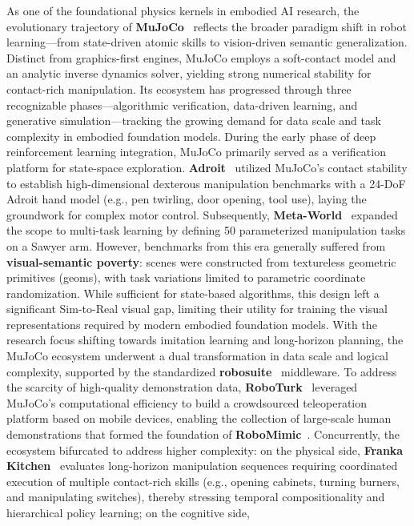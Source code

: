 \documentclass[acmsmall,screen,review,anonymous]{acmart}
\begin{document}
As one of the foundational physics kernels in embodied AI research, the evolutionary trajectory of \textbf{MuJoCo}~\cite{todorov2012mujoco} reflects the broader paradigm shift in robot learning---from state-driven atomic skills to vision-driven semantic generalization. 
Distinct from graphics-first engines, MuJoCo employs a soft-contact model and an analytic inverse dynamics solver, yielding strong numerical stability for contact-rich manipulation. 
Its ecosystem has progressed through three recognizable phases---algorithmic verification, data-driven learning, and generative simulation---tracking the growing demand for data scale and task complexity in embodied foundation models.
During the early phase of deep reinforcement learning integration, MuJoCo primarily served as a verification platform for state-space exploration. 
\textbf{Adroit}~\cite{rajeswaran2017learning} utilized MuJoCo's contact stability to establish high-dimensional dexterous manipulation benchmarks with a 24-DoF Adroit hand model (e.g., pen twirling, door opening, tool use), laying the groundwork for complex motor control. 
Subsequently, \textbf{Meta-World}~\cite{yu2021meta} expanded the scope to multi-task learning by defining 50 parameterized manipulation tasks on a Sawyer arm. 
However, benchmarks from this era generally suffered from \textbf{visual-semantic poverty}: scenes were constructed from textureless geometric primitives (geoms), with task variations limited to parametric coordinate randomization. 
While sufficient for state-based algorithms, this design left a significant Sim-to-Real visual gap, limiting their utility for training the visual representations required by modern embodied foundation models.
With the research focus shifting towards imitation learning and long-horizon planning, the MuJoCo ecosystem underwent a dual transformation in data scale and logical complexity, supported by the standardized \textbf{robosuite}~\cite{zhu2020robosuite} middleware. 
To address the scarcity of high-quality demonstration data, \textbf{RoboTurk}~\cite{mandlekar2018roboturk} leveraged MuJoCo's computational efficiency to build a crowdsourced teleoperation platform based on mobile devices, 
enabling the collection of large-scale human demonstrations that formed the foundation of \textbf{RoboMimic}~\cite{mandlekar2022matters}. 
Concurrently, the ecosystem bifurcated to address higher complexity: on the physical side, \textbf{Franka Kitchen}~\cite{gupta2019frankakitchen} evaluates long-horizon manipulation sequences requiring coordinated execution of multiple contact-rich skills (e.g., opening cabinets, turning burners, and manipulating switches), thereby stressing temporal compositionality and hierarchical policy learning; on the cognitive side, 
\end{document}
